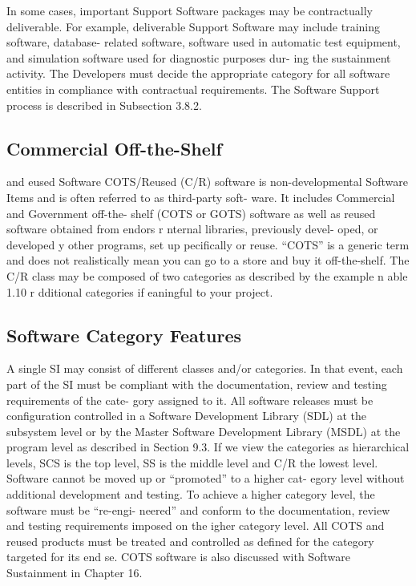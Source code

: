 \documentclass{book}
\begin{document}
\begin{multicols}{2}
In some cases, important Support Software packages
may be contractually deliverable. For example, deliverable
Support Software may include training software, database-
related software, software used in automatic test equipment,
and simulation software used for diagnostic purposes dur-
ing the sustainment activity. The Developers must decide the
appropriate category for all software entities in compliance
with contractual requirements. The Software Support process
is described in Subsection 3.8.2.

\subsection{Commercial Off-the-Shelf}
and eused Software
COTS/Reused (C/R) software is non-developmental
Software Items and is often referred to as third-party soft-
ware. It includes Commercial and Government off-the-
shelf (COTS or GOTS) software as well as reused software
obtained from endors r nternal libraries, previously devel-
oped, or developed y other programs, set up pecifically or
reuse. “COTS” is a generic term and does not realistically
mean you can go to a store and buy it off-the-shelf. The C/R
class may be composed of two categories as described by the
example n able 1.10 r dditional categories if eaningful
to your project.

\subsection{Software Category Features}
A single SI may consist of different classes and/or categories.
In that event, each part of the SI must be compliant with the
documentation, review and testing requirements of the cate-
gory assigned to it. All software releases must be configuration
controlled in a Software Development Library (SDL) at the
subsystem level or by the Master Software Development Library
(MSDL) at the program level as described in Section 9.3.
If we view the categories as hierarchical levels, SCS is
the top level, SS is the middle level and C/R the lowest level.
Software cannot be moved up or “promoted” to a higher cat-
egory level without additional development and testing. To
achieve a higher category level, the software must be “re-engi-
neered” and conform to the documentation, review and testing
requirements imposed on the igher category level. All COTS
and reused products must be treated and controlled as defined
for the category targeted for its end se. COTS software is also
discussed with Software Sustainment in Chapter 16.


\end{multicols}
\end{document}
